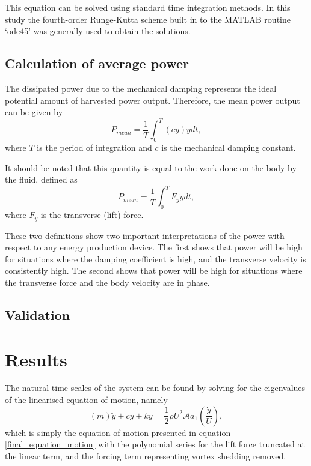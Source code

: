 This equation can be solved using standard time integration methods. In this study the fourth-order Runge-Kutta scheme built in to the MATLAB routine `ode45' was generally used to obtain the solutions. 

\subsection{Calculation of average power}

 The dissipated power due to the mechanical damping represents the ideal potential amount of harvested power output. Therefore, the mean power output can be given by
\begin{equation}
\label{power}
P_{mean}=\frac{1}{T}\int_{0}^{T}(c\dot{y})\dot{y} dt,
\end{equation}
where $T$ is the period of integration and $c$ is the mechanical damping constant. 

It should be noted that this quantity is equal to the work done on the body by the fluid, defined as
\begin{equation}
\label{power_alt}
P_{mean}=\frac{1}{T}\int_{0}^{T}F_y\dot{y} dt,
\end{equation}
where $F_y$ is the transverse (lift) force.

These two definitions show two important interpretations of the power with respect to any energy production device. The first shows that power will be high for situations where the damping coefficient is high, and the transverse velocity is consistently high. The second shows that power will be high for situations where the transverse force and the body velocity are in phase.
 
 

 
 
 \subsection{Validation}
 \label{ubsec:validation}
 
 
 
 \section{Results}
  \label{sec:results}
 
  The natural time scales of the system can be found by solving for the eigenvalues of the linearised equation of motion, namely
 \begin{equation}
 \label{eqn:eom_linear}
 (m)\ddot{y}{+}c\dot{y}{+}ky{=}\frac{1}{2}\rho U^2 \mathcal{A} a_1\left(\frac{\dot{y}}{U}\right),
 \end{equation}
 which is simply the equation of motion presented in equation \ref{final_equation_motion} with the polynomial series for the lift force truncated at the linear term, and the forcing term representing vortex shedding removed.
 
